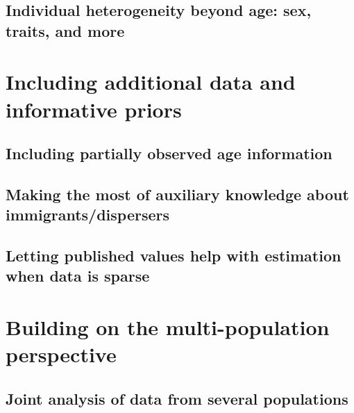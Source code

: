 \documentclass[
]{book}
\begin{document}
\hypertarget{individual-heterogeneity-beyond-age-sex-traits-and-more}{%
\subsection{Individual heterogeneity beyond age: sex, traits, and more}\label{individual-heterogeneity-beyond-age-sex-traits-and-more}}

\hypertarget{including-additional-data-and-informative-priors}{%
\section{Including additional data and informative priors}\label{including-additional-data-and-informative-priors}}

\hypertarget{including-partially-observed-age-information}{%
\subsection{Including partially observed age information}\label{including-partially-observed-age-information}}

\hypertarget{making-the-most-of-auxiliary-knowledge-about-immigrantsdispersers}{%
\subsection{Making the most of auxiliary knowledge about immigrants/dispersers}\label{making-the-most-of-auxiliary-knowledge-about-immigrantsdispersers}}

\hypertarget{letting-published-values-help-with-estimation-when-data-is-sparse}{%
\subsection{Letting published values help with estimation when data is sparse}\label{letting-published-values-help-with-estimation-when-data-is-sparse}}

\hypertarget{building-on-the-multi-population-perspective}{%
\section{Building on the multi-population perspective}\label{building-on-the-multi-population-perspective}}

\hypertarget{joint-analysis-of-data-from-several-populations}{%
\subsection{Joint analysis of data from several populations}\label{joint-analysis-of-data-from-several-populations}}
\end{document}
